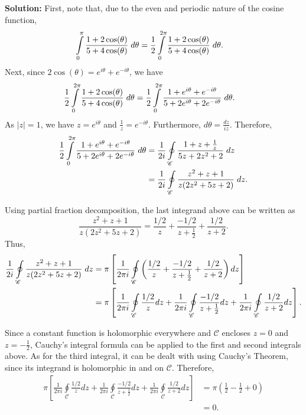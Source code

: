\documentclass{article}
\newcommand{\mybox}{%
    \collectbox{%
        \setlength{\fboxsep}{1pt}%
        \fbox{\BOXCONTENT}%
    }%
}
\begin{document}
\noindent\mybox{\textbf{Solution:}}  First, note that, due to the even and periodic nature of the cosine function, 
\begin{align}
\int\limits_0^{\pi} \frac{1+2\cos(\theta)}{5+4\cos(\theta)} \hspace{1mm} d\theta &= \frac{1}{2} \int\limits_0^{2\pi} \frac{1+2\cos(\theta)}{5+4\cos(\theta)} \hspace{1mm} d\theta.
\end{align}
Next, since $2\cos(\theta) = e^{i\theta} + e^{-i\theta}$, we have 
\begin{align}
\frac{1}{2}\int\limits_0^{2\pi} \frac{1+2\cos(\theta)}{5+4\cos(\theta)} \hspace{1mm} d\theta &= \frac{1}{2}\int\limits_0^{2\pi} \frac{1+e^{i\theta} + e^{-i\theta}}{5+2e^{i\theta} + 2e^{-i\theta}} \hspace{1mm} d\theta.
\end{align}
\noindent As $|z|=1$, we have $z=e^{i\theta}$ and $\frac{1}{z} = e^{-i\theta}$.  Furthermore, $d\theta = \frac{dz}{iz}$. Therefore,
\begin{align}
\frac{1}{2}\int\limits_0^{2\pi} \frac{1+e^{i\theta} + e^{-i\theta}}{5+2e^{i\theta} + 2e^{-i\theta}} \hspace{1mm} d\theta &= \frac{1}{2i}\oint\limits_{\mathscr{C}}\frac{1+z+\frac{1}{z}}{5z+2z^2+2} \hspace{1mm} dz \\ 
&= \frac{1}{2i}\oint\limits_{\mathscr{C}}\frac{z^2 + z + 1}{z(2z^2+5z+2)} \hspace{1mm} dz.
\end{align}

\noindent Using partial fraction decomposition, the last integrand above can be written as $$\frac{z^2 + z + 1}{z(2z^2+5z+2)} = \frac{1/2}{z} + \frac{-1/2}{z+\frac{1}{2}} + \frac{1/2}{z+2}.$$  Thus, 
\begin{align}
\frac{1}{2i}\oint\limits_{\mathscr{C}}\frac{z^2 + z + 1}{z(2z^2+5z+2)} \hspace{1mm} dz &= \pi\left[\frac{1}{2\pi i}\oint\limits_{\mathscr{C}} \left(\frac{1/2}{z} + \frac{-1/2}{z+\frac{1}{2}} + \frac{1/2}{z+2}\right) dz\right] \\
&= \pi \left[\frac{1}{2\pi i}\oint\limits_{\mathscr{C}} \frac{1/2}{z} dz + \frac{1}{2\pi i}\oint\limits_{\mathscr{C}}\frac{-1/2}{z+\frac{1}{2}} dz + \frac{1}{2\pi i}\oint\limits_{\mathscr{C}}\frac{1/2}{z+2} dz \right].
\end{align}

\noindent Since a constant function is holomorphic everywhere and $\mathscr{C}$ encloses $z=0$ and $z=-\frac{1}{2}$, Cauchy's integral formula can be applied to the first and second integrals above.  As for the third integral, it can be dealt with using Cauchy's Theorem, since its integrand is holomorphic in and on $\mathscr{C}$.  Therefore,
\begin{align}
\pi \left[\frac{1}{2\pi i}\oint\limits_{\mathscr{C}} \frac{1/2}{z} dz + \frac{1}{2\pi i}\oint\limits_{\mathscr{C}}\frac{-1/2}{z+\frac{1}{2}} dz + \frac{1}{2\pi i}\oint\limits_{\mathscr{C}}\frac{1/2}{z+2} dz \right] &= \pi \left( \frac{1}{2} - \frac{1}{2} + 0\right) \\
&= 0.  
\end{align}
\end{document}
